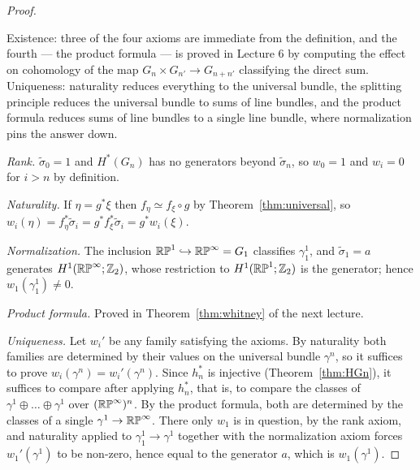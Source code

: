 \begin{proof}
\begin{strategy}
Existence: three of the four axioms are immediate from the definition, and the
fourth --- the product formula --- is proved in Lecture 6 by computing the
effect on cohomology of the map $G_n\times G_{n'}\to G_{n+n'}$ classifying the
direct sum. Uniqueness: naturality reduces everything to the universal bundle,
the splitting principle reduces the universal bundle to sums of line bundles,
and the product formula reduces sums of line bundles to a single line bundle,
where normalization pins the answer down.
\end{strategy}

 \emph{Rank.} $\tilde\sigma_0=1$ and $H^*(G_n)$ has no generators beyond
$\tilde\sigma_n$, so $w_0=1$ and $w_i=0$ for $i>n$ by definition.

 \emph{Naturality.} If $\eta=g^*\xi$ then $f_\eta\simeq f_\xi\circ g$ by
Theorem~\ref{thm:universal}, so
$w_i(\eta)=f_\eta^*\tilde\sigma_i=g^*f_\xi^*\tilde\sigma_i=g^*w_i(\xi)$.

 \emph{Normalization.} The inclusion $\mathbb{RP}^1\hookrightarrow\mathbb{RP}^\infty=G_1$
classifies $\gamma^1_1$, and $\tilde\sigma_1=a$ generates
$H^1(\mathbb{RP}^\infty;\mathbb{Z}_2)$, whose restriction to $H^1(\mathbb{RP}^1;\mathbb{Z}_2)$ is the generator;
hence $w_1(\gamma^1_1)\neq0$.

 \emph{Product formula.} Proved in Theorem~\ref{thm:whitney} of the next
lecture.

 \emph{Uniqueness.} Let $w_i'$ be any family satisfying the axioms. By
naturality both families are determined by their values on the universal bundle
$\gamma^n$, so it suffices to prove $w_i(\gamma^n)=w_i'(\gamma^n)$. Since
$h_n^*$ is injective (Theorem~\ref{thm:HGn}), it suffices to compare after
applying $h_n^*$, that is, to compare the classes of
$\gamma^1\oplus\dots\oplus\gamma^1$ over $(\mathbb{RP}^\infty)^n$. By the product
formula, both are determined by the classes of a single $\gamma^1\to\mathbb{RP}^\infty$.
There only $w_1$ is in question, by the rank axiom, and naturality applied to
$\gamma^1_1\to\gamma^1$ together with the normalization axiom forces
$w_1'(\gamma^1)$ to be non-zero, hence equal to the generator $a$, which is
$w_1(\gamma^1)$.
\end{proof}

